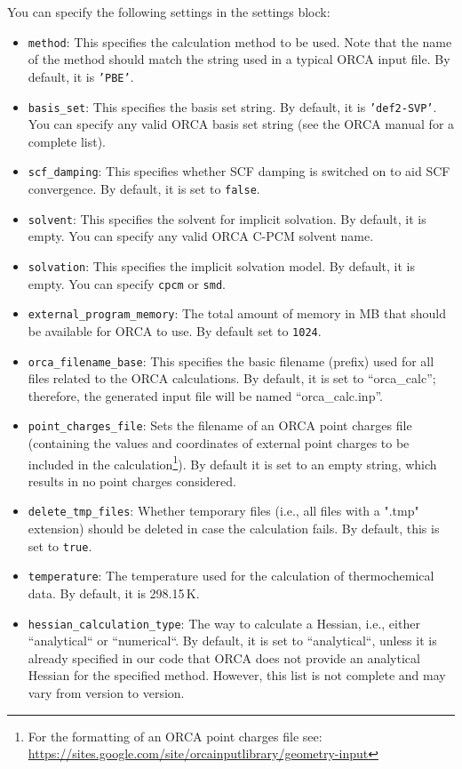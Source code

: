 \documentclass[]{tufte-book}
\begin{document}
You can specify the following settings in the settings block:
\begin{itemize}
\item \texttt{method}: This specifies the calculation method to be used.
Note that the name of the method should match the string used in a typical \textsc{ORCA} input file.
By default, it is \texttt{'PBE'}.
\item \texttt{basis\_set}: This specifies the basis set string. By default, it is \texttt{'def2-SVP'}. You can specify
any valid ORCA basis set string (see the \textsc{ORCA} manual for a complete list).
\item \texttt{scf\_damping}: This specifies whether SCF damping is switched on to aid SCF convergence. By default, it is set to \texttt{false}.
\item \texttt{solvent}: This specifies the solvent for implicit solvation. By default, it is empty. You can specify any valid \textsc{ORCA} C-PCM solvent name.
\item \texttt{solvation}: This specifies the implicit solvation model. By default, it is empty. You can specify \texttt{cpcm} or \texttt{smd}.
\item \texttt{external\_program\_memory}: The total amount of memory in MB that should be available for \textsc{ORCA} to use.
By default set to \texttt{1024}.
\item \texttt{orca\_filename\_base}: This specifies the basic filename (prefix) used for all files related to the \textsc{ORCA} calculations.
By default, it is set to ``orca\_calc''; therefore, the generated input file will be named ``orca\_calc.inp''.
\item \texttt{point\_charges\_file}: Sets the filename of an \textsc{ORCA} point charges file (containing the values and coordinates of
external point charges to be included in the calculation\footnote{For the formatting of an \textsc{ORCA} point charges file see: \url{https://sites.google.com/site/orcainputlibrary/geometry-input}}).
By default it is set to an empty string, which results
in no point charges considered.
\item \texttt{delete\_tmp\_files}: Whether temporary files (i.e., all files with a ".tmp" extension) should be deleted in case
the calculation fails. By default, this is set to \texttt{true}.
\item \texttt{temperature}: The temperature used for the calculation of thermochemical data. By default, it is 298.15\,K.
\item \texttt{hessian\_calculation\_type}: The way to calculate a Hessian, i.e., either ``analytical`` or ``numerical``. By default, it is set to ``analytical``, unless it is already specified in our code that \textsc{ORCA} does not provide an analytical Hessian for the specified method. However, this list is not complete and may vary from version to version.
\end{itemize}
\end{document}
